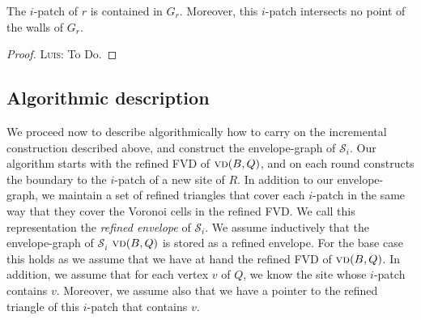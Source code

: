 \documentclass[a4paper,UKenglish]{socg-lipics-v2018}
\newcommand{\icell}[1][i]{${#1}$-patch\xspace}
\newcommand{\s}{\mathcal S}
\newcommand{\bcell}[2][P]{\ensuremath{\partial_{\scriptscriptstyle #1}(#2)}}
\newcommand{\vd}[2][P]{\textsc{vd}(#2, #1)}
\newcommand{\red}{\color{red}}
\newcommand{\marrow}{\marginpar[\hfill$\longrightarrow$]{$\longleftarrow$}}
\newcommand{\luis}[1]{{\red \textsc{Luis:} \marrow\textsf{#1}}}
\begin{document}
\begin{lemma}\label{lemma: Patch in G_r}
The \icell of $r$ is contained in $G_r$. Moreover, this \icell intersects no point of the walls of $G_r$.
\end{lemma}
\begin{proof}
\luis{To Do.}

\end{proof}




\subsection{Algorithmic description} 

We proceed now to describe algorithmically how to carry on the incremental construction described above, and construct the envelope-graph of $\s_i$.
Our algorithm starts with the refined FVD of $\vd[Q]{B}$, and on each round constructs the boundary to the \icell of a new site of $R$. 
In addition to our envelope-graph, we maintain a set of refined triangles that cover each \icell in the same way that they cover the Voronoi cells in the refined FVD.
We call this representation the \emph{refined envelope} of $\s_i$.
We assume inductively that the envelope-graph of $\s_i$ $\vd[Q]{B}$ is stored as a refined envelope. 
For the base case this holds as we assume that we have at hand the refined FVD of $\vd[Q]{B}$.
In addition, we assume that for each vertex $v$ of $Q$, we know the site whose \icell contains $v$. 
Moreover, we assume also that we have a pointer to the refined triangle of this \icell that contains $v$.
\end{document}
